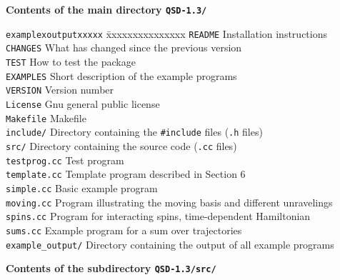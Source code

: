 \begin{table}

{\hfill\bf Contents of the main directory {\tt QSD-1.3/} \hfill}

\begin{tabbing}
{\tt examplexoutputxxxxx} \= xxxxxxxxxxxxxxx \kill
{\tt README} \>  Installation instructions \\
{\tt CHANGES} \> What has changed since the previous version \\
{\tt TEST} \>    How to test the package \\
{\tt EXAMPLES} \>  Short description of the example programs \\
{\tt VERSION} \>   Version number \\
{\tt License} \>   Gnu general public license \\
{\tt Makefile} \>  Makefile \\
{\tt include/} \> Directory containing the {\tt \#include} 
                  files ({\tt .h} files) \\
{\tt src/} \>     Directory containing the source code ({\tt .cc} files)  \\
{\tt testprog.cc} \> Test program \\
{\tt template.cc} \> Template program described in Section 6 \\
{\tt simple.cc} \> Basic example program \\
{\tt moving.cc} \> Program illustrating the moving basis and 
                   different unravelings \\
{\tt spins.cc} \> Program for interacting spins, time-dependent Hamiltonian \\
{\tt sums.cc} \>  Example program for a sum over trajectories  \\
{\tt example\_output/} \> Directory containing the 
                          output of all example programs \\
\end{tabbing}

{\hfill\bf Contents of the subdirectory {\tt QSD-1.3/src/} \hfill}


\end{table}
